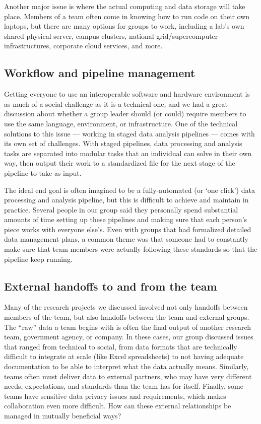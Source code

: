 \documentclass[11pt]{elife}
\begin{document}
Another major issue is where the actual computing and data storage will take place. Members of a team often come in knowing how to run code on their own laptops, but there are many options for groups to work, including a lab’s own shared physical server, campus clusters, national grid/supercomputer infrastructures, corporate cloud services, and more.

\subsection{Workflow and pipeline management}

Getting everyone to use an interoperable software and hardware environment is as much of a social challenge as it is a technical one, and we had a great discussion about whether a group leader should (or could) require members to use the same language, environment, or infrastructure. One of the technical solutions to this issue --- working in staged data analysis pipelines --- comes with its own set of challenges. With staged pipelines, data processing and analysis tasks are separated into modular tasks that an individual can solve in their own way, then output their work to a standardized file for the next stage of the pipeline to take as input. 


The ideal end goal is often imagined to be a fully-automated (or ‘one click’) data processing and analysis pipeline, but this is difficult to achieve and maintain in practice. Several people in our group said they personally spend substantial amounts of time setting up these pipelines and making sure that each person’s piece works with everyone else’s. Even with groups that had formalized detailed data management plans, a common theme was that someone had to constantly make sure that team members were actually following these standards so that the pipeline keep running. 

\subsection{External handoffs to and from the team}

Many of the research projects we discussed involved not only handoffs between members of the team, but also handoffs between the team and external groups. The “raw” data a team begins with is often the final output of another research team, government agency, or company. In these cases, our group discussed issues that ranged from technical to social, from data formats that are technically difficult to integrate at scale (like Excel spreadsheets) to not having adequate documentation to be able to interpret what the data actually means. Similarly, teams often must deliver data to external partners, who may have very different needs, expectations, and standards than the team has for itself. Finally, some teams have sensitive data privacy issues and requirements, which makes collaboration even more difficult. How can these external relationships be managed in mutually beneficial ways?
\end{document}
